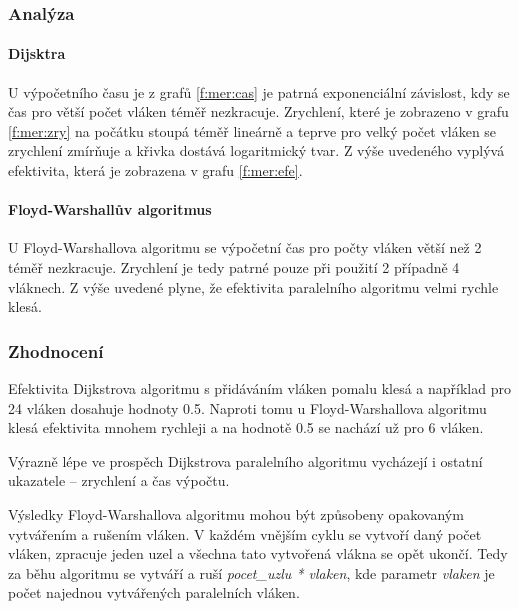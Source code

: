 \subsubsection{Analýza}
\paragraph{Dijsktra}
U výpočetního času je z grafů \ref{f:mer:cas} je patrná exponenciální závislost, kdy se čas pro větší počet vláken téměř nezkracuje. Zrychlení, které je zobrazeno v grafu \ref{f:mer:zry} na počátku stoupá téměř lineárně a teprve pro velký počet vláken se zrychlení zmírňuje a křivka dostává logaritmický tvar. Z výše uvedeného vyplývá efektivita, která je zobrazena v grafu \ref{f:mer:efe}.

\paragraph{Floyd-Warshallův algoritmus}
U Floyd-Warshallova algoritmu se výpočetní čas pro počty vláken větší než 2 téměř nezkracuje. Zrychlení je tedy patrné pouze při použití 2 případně 4 vláknech. Z výše uvedené plyne, že efektivita paralelního algoritmu velmi rychle klesá.

\subsubsection{Zhodnocení}
Efektivita Dijkstrova algoritmu s přidáváním vláken pomalu klesá a například pro 24 vláken dosahuje hodnoty 0.5. Naproti tomu u Floyd-Warshallova algoritmu klesá efektivita mnohem rychleji a na hodnotě 0.5 se nachází už pro 6 vláken. 

Výrazně lépe ve prospěch Dijkstrova paralelního algoritmu vycházejí i ostatní ukazatele -- zrychlení a čas výpočtu.

Výsledky Floyd-Warshallova algoritmu mohou být způsobeny opakovaným vytvářením a rušením vláken. V každém vnějším cyklu se vytvoří daný počet vláken, zpracuje jeden uzel a všechna tato vytvořená vlákna se opět ukončí. Tedy za běhu algoritmu se vytváří a ruší \textit{pocet\_uzlu * vlaken}, kde parametr \textit{vlaken} je počet najednou vytvářených paralelních vláken.


